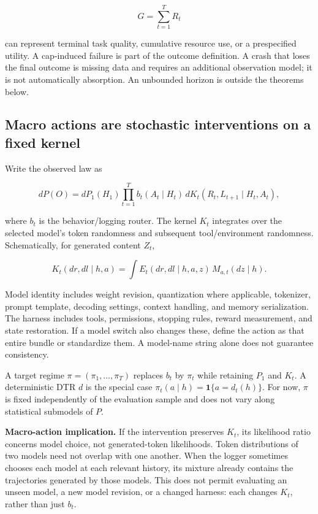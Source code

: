 \[
G=\sum_{t=1}^{T}R_t
\]

can represent terminal task quality, cumulative resource use, or a prespecified utility. A cap-induced failure is part of the outcome definition. A crash that loses the final outcome is missing data and requires an additional observation model; it is not automatically absorption. An unbounded horizon is outside the theorems below.

\subsection{Macro actions are stochastic interventions on a fixed kernel}\label{macro-actions-are-stochastic-interventions-on-a-fixed-kernel}

Write the observed law as

\begin{equation}\label{eq:core1}
dP(O)=dP_1(H_1)\prod_{t=1}^{T}
b_t(A_t\mid H_t)\,dK_t(R_t,L_{t+1}\mid H_t,A_t),
\end{equation}

where \(b_t\) is the behavior/logging router. The kernel \(K_t\) integrates over the selected model's token randomness and subsequent tool/environment randomness. Schematically, for generated content \(Z_t\),

\begin{equation}\label{eq:core2}
K_t(dr,dl\mid h,a)
=\int E_t(dr,dl\mid h,a,z)\,M_{a,t}(dz\mid h).
\end{equation}

Model identity includes weight revision, quantization where applicable, tokenizer, prompt template, decoding settings, context handling, and memory serialization. The harness includes tools, permissions, stopping rules, reward measurement, and state restoration. If a model switch also changes these, define the action as that entire bundle or standardize them. A model-name string alone does not guarantee consistency.

A target regime \(\pi=(\pi_1,\ldots,\pi_T)\) replaces \(b_t\) by \(\pi_t\) while retaining \(P_1\) and \(K_t\). A deterministic DTR \(d\) is the special case \(\pi_t(a\mid h)=\mathbf{1}\{a=d_t(h)\}\). For now, \(\pi\) is fixed independently of the evaluation sample and does not vary along statistical submodels of \(P\).

\textbf{Macro-action implication.} If the intervention preserves \(K_t\), its likelihood ratio concerns model choice, not generated-token likelihoods. Token distributions of two models need not overlap with one another. When the logger sometimes chooses each model at each relevant history, its mixture already contains the trajectories generated by those models. This does not permit evaluating an unseen model, a new model revision, or a changed harness: each changes \(K_t\), rather than just \(b_t\).

